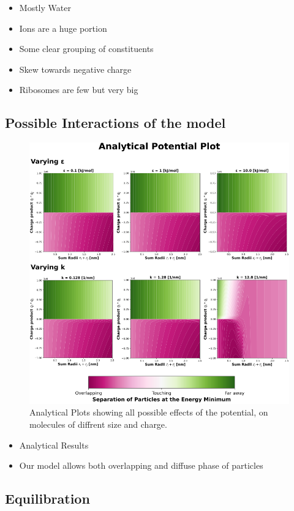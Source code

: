 \documentclass[a4paper,11pt,oneside]{book}
\begin{document}
\begin{itemize}
\item Mostly Water
\item Ions are a huge portion
\item Some clear grouping of constituents
\item Skew towards negative charge
\item Ribosomes are few but very big
\end{itemize}

\subsection{Possible Interactions of the model}

\begin{figure}[!htbp]
\centering
\includegraphics[width=0.7\linewidth]{files/Fig2-4a634fb40ba25fe916b6010c8907b16e.png}
\caption[]{Analytical Plots showing all possible effects of the potential, on molecules of diffrent size and charge.}
\label{Fig2_PotentialPlot}
\end{figure}

\begin{itemize}
\item Analytical Results
\end{itemize}

\begin{itemize}
\item Our model allows both overlapping and diffuse phase of particles
\end{itemize}

\subsection{Equilibration}
\end{document}
